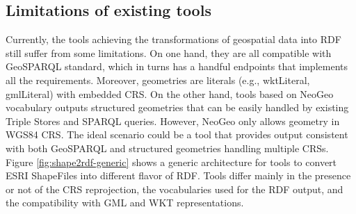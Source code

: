 \subsection{Limitations of existing tools}
\label{sec:limitations}

Currently, the tools achieving the transformations of geospatial data into RDF still suffer from some limitations. On one hand, they are all compatible with GeoSPARQL standard, which in turns has a handful endpoints that implements all the requirements. Moreover, geometries are literals (e.g., wktLiteral, gmlLiteral) with embedded CRS. On the other hand, tools based on NeoGeo vocabulary outputs structured geometries that can be easily handled by existing Triple Stores and SPARQL queries. However, NeoGeo only allows geometry in WGS84 CRS. The ideal scenario could be a tool that provides output consistent with both GeoSPARQL and structured geometries handling multiple CRSs.
Figure \ref{fig:shape2rdf-generic} shows a generic architecture for tools to convert ESRI ShapeFiles into different flavor of RDF. Tools differ mainly in the presence or not of the CRS reprojection, the vocabularies used for the RDF output, and the compatibility with GML and WKT representations.

\begin{figure}[ht!b]
\end{figure}


